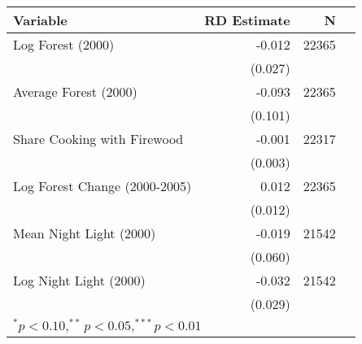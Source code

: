 \begin{tabular}{l r r r}\hline\hline Variable & RD Estimate  & N \\ \hline
Log Forest (2000) & -0.012 & 22365 \\ 
 & (0.027) & \\
Average Forest (2000) & -0.093 & 22365 \\ 
 & (0.101) & \\
Share Cooking with Firewood & -0.001 & 22317 \\ 
 & (0.003) & \\
Log Forest Change (2000-2005) & 0.012 & 22365 \\ 
 & (0.012) & \\
Mean Night Light (2000) & -0.019 & 21542 \\ 
 & (0.060) & \\
Log Night Light (2000) & -0.032 & 21542 \\ 
 & (0.029) & \\
\hline\hline \multicolumn{2}{p{24em}}{$^{*}p<0.10, ^{**}p<0.05,^{***}p<0.01$} \\ \end{tabular} 

